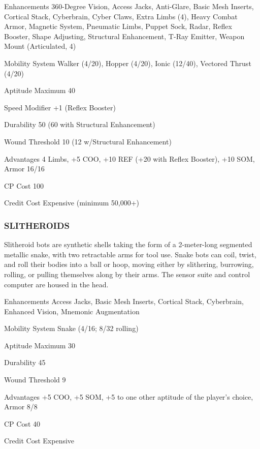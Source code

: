 \begin{description*}
\item[Enhancements] 360-Degree Vision, Access Jacks, Anti-Glare, Basic Mesh
  Inserts, Cortical Stack, Cyberbrain, Cyber Claws, Extra Limbs (4), Heavy
  Combat Armor, Magnetic System, Pneumatic Limbs, Puppet Sock, Radar, Reflex
  Booster, Shape Adjusting, Structural Enhancement, T-Ray Emitter, Weapon Mount
  (Articulated, 4)
\item[Mobility System] Walker (4/20), Hopper (4/20), Ionic (12/40), Vectored
  Thrust (4/20)
\item[Aptitude Maximum]  40 
\item[Speed Modifier]  +1 (Reflex Booster) 
\item[Durability]  50 (60 with Structural Enhancement) 
\item[Wound Threshold]  10 (12 w/Structural Enhancement) 
\item[Advantages] 4 Limbs, +5 COO, +10 REF (+20 with Reflex Booster), +10 SOM,
  Armor 16/16
\item[CP Cost]  100 
\item[Credit Cost] Expensive (minimum 50,000+)
\end{description*}

\subsubsection{SLITHEROIDS}
Slitheroid bots are synthetic shells taking the form of a 2-meter-long
segmented metallic snake, with two retractable arms for tool use. Snake bots
can coil, twist, and roll their bodies into a ball or hoop, moving either by
slithering, burrowing, rolling, or pulling themselves along by their arms. The
sensor suite and control computer are housed in the head.

\begin{description*}
\item[Enhancements] Access Jacks, Basic Mesh Inserts, Cortical Stack,
  Cyberbrain, Enhanced Vision, Mnemonic Augmentation
\item[Mobility System]  Snake (4/16; 8/32 rolling) 
\item[Aptitude Maximum]  30 
\item[Durability]  45 
\item[Wound Threshold]  9 
\item[Advantages] +5 COO, +5 SOM, +5 to one other aptitude of the player’s
  choice, Armor 8/8
\item[CP Cost]  40 
\item[Credit Cost] Expensive
\end{description*}

